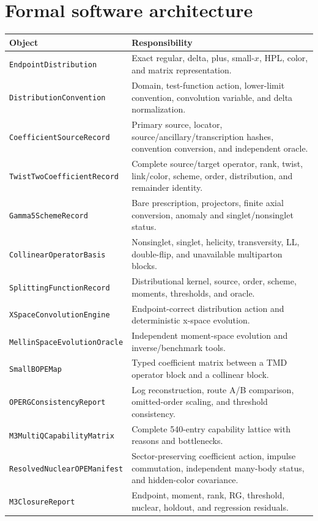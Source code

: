 \documentclass[11pt]{article}
\begin{document}
\section{Formal software architecture}
\label{sec:software}

\begin{longtable}{L{0.28\textwidth}L{0.64\textwidth}}
\toprule
Object & Responsibility\\
\midrule
\endhead
\texttt{EndpointDistribution} & Exact regular, delta, plus, small-\(x\), HPL, color, and matrix representation.\\
\texttt{DistributionConvention} & Domain, test-function action, lower-limit convention, convolution variable, and delta normalization.\\
\texttt{CoefficientSourceRecord} & Primary source, locator, source/ancillary/transcription hashes, convention conversion, and independent oracle.\\
\texttt{TwistTwo\allowbreak Coefficient\allowbreak Record} & Complete source/target operator, rank, twist, link/color, scheme, order, distribution, and remainder identity.\\
\texttt{Gamma5SchemeRecord} & Bare prescription, projectors, finite axial conversion, anomaly and singlet/nonsinglet status.\\
\texttt{CollinearOperatorBasis} & Nonsinglet, singlet, helicity, transversity, LL, double-flip, and unavailable multiparton blocks.\\
\texttt{SplittingFunctionRecord} & Distributional kernel, source, order, scheme, moments, thresholds, and oracle.\\
\texttt{XSpaceConvolutionEngine} & Endpoint-correct distribution action and deterministic x-space evolution.\\
\texttt{MellinSpace\allowbreak Evolution\allowbreak Oracle} & Independent moment-space evolution and inverse/benchmark tools.\\
\texttt{SmallBOPEMap} & Typed coefficient matrix between a TMD operator block and a collinear block.\\
\texttt{OPERGConsistencyReport} & Log reconstruction, route A/B comparison, omitted-order scaling, and threshold consistency.\\
\texttt{M3MultiQCapabilityMatrix} & Complete 540-entry capability lattice with reasons and bottlenecks.\\
\texttt{ResolvedNuclear\allowbreak OPE\allowbreak Manifest} & Sector-preserving coefficient action, impulse commutation, independent many-body status, and hidden-color covariance.\\
\texttt{M3ClosureReport} & Endpoint, moment, rank, RG, threshold, nuclear, holdout, and regression residuals.\\
\bottomrule
\end{longtable}
\end{document}

